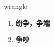
\begin{frame}
{\huge wrangle}
\begin{center}
\begin{enumerate}\Large
  \item \textbf{纷争，争端}
  \item \textbf{争吵}
\end{enumerate}
\end{center}
\end{frame}
